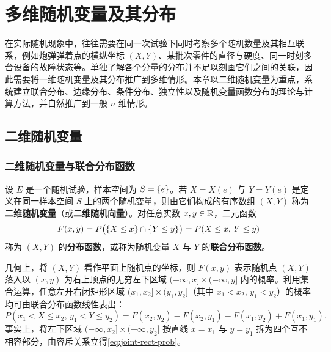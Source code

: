 %
%

\chapter{多维随机变量及其分布}
\label{ch:multivariate}

在实际随机现象中，往往需要在同一次试验下同时考察多个随机数量及其相互联系，例如炮弹弹着点的横纵坐标 $(X,Y)$、某批次零件的直径与硬度、同一时刻多台设备的故障状态等。单独了解各个分量的分布并不足以刻画它们之间的关联，因此需要将一维随机变量及其分布推广到多维情形。本章以二维随机变量为重点，系统建立联合分布、边缘分布、条件分布、独立性以及随机变量函数分布的理论与计算方法，并自然推广到一般 $n$ 维情形。

\section{二维随机变量}
\label{sec:joint-distribution}

\subsection{二维随机变量与联合分布函数}

\begin{definition}[二维随机变量与联合分布函数]
\label{def:joint-cdf}
设 $E$ 是一个随机试验，样本空间为 $S=\{e\}$。若 $X=X(e)$ 与 $Y=Y(e)$ 是定义在同一样本空间 $S$ 上的两个随机变量，则由它们构成的有序数组 $(X,Y)$ 称为\textbf{二维随机变量}（或\textbf{二维随机向量}）。对任意实数 $x,y\in\mathbb{R}$，二元函数
\begin{equation}
  F(x,y)=P\bigl(\{X\le x\}\cap\{Y\le y\}\bigr)=P(X\le x,\,Y\le y)
  \label{eq:joint-cdf}
\end{equation}
称为 $(X,Y)$ 的\textbf{分布函数}，或称为随机变量 $X$ 与 $Y$ 的\textbf{联合分布函数}。
\end{definition}

几何上，将 $(X,Y)$ 看作平面上随机点的坐标，则 $F(x,y)$ 表示随机点 $(X,Y)$ 落入以 $(x,y)$ 为右上顶点的无穷左下区域 $(-\infty,x]\times(-\infty,y]$ 内的概率。利用集合运算，任意左开右闭矩形区域 $(x_1,x_2]\times(y_1,y_2]$（其中 $x_1<x_2,\,y_1<y_2$）的概率均可由联合分布函数线性表出：
\begin{equation}
  P(x_1<X\le x_2,\,y_1<Y\le y_2)
  =F(x_2,y_2)-F(x_2,y_1)-F(x_1,y_2)+F(x_1,y_1).
  \label{eq:joint-rect-prob}
\end{equation}
事实上，将左下区域 $(-\infty,x_2]\times(-\infty,y_2]$ 按直线 $x=x_1$ 与 $y=y_1$ 拆为四个互不相容部分，由容斥关系立得\eqref{eq:joint-rect-prob}。

